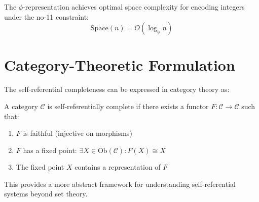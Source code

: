 \begin{theorem}
The $\phi$-representation achieves optimal space complexity for encoding integers under the no-11 constraint:
\begin{equation}
\text{Space}(n) = O(\log_\phi n)
\end{equation}
\end{theorem}

\section{Category-Theoretic Formulation}

The self-referential completeness can be expressed in category theory as:

\begin{definition}
A category $\mathcal{C}$ is self-referentially complete if there exists a functor $F: \mathcal{C} \to \mathcal{C}$ such that:
\begin{enumerate}
\item $F$ is faithful (injective on morphisms)
\item $F$ has a fixed point: $\exists X \in \text{Ob}(\mathcal{C}): F(X) \cong X$
\item The fixed point $X$ contains a representation of $F$
\end{enumerate}
\end{definition}

This provides a more abstract framework for understanding self-referential systems beyond set theory.